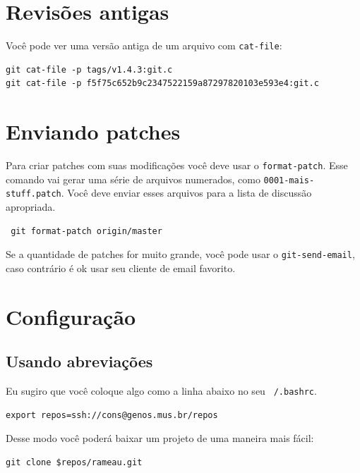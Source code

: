 \documentclass[12pt,brazil]{book}
\begin{document}
\section{Revisões antigas}
\label{sec:revisoes-antigas}

Você pode ver uma versão antiga de um arquivo com \texttt{cat-file}:

\begin{verbatim}
git cat-file -p tags/v1.4.3:git.c
git cat-file -p f5f75c652b9c2347522159a87297820103e593e4:git.c
\end{verbatim}

\section{Enviando patches}
\label{sec:enviando-patches}

Para criar patches com suas modificações você deve usar o
\texttt{format-patch}. Esse comando vai gerar uma série de arquivos
numerados, como \texttt{0001-mais-stuff.patch}. Você deve enviar esses
arquivos para a lista de discussão apropriada.

\begin{verbatim}
 git format-patch origin/master
\end{verbatim}

Se a quantidade de patches for muito grande, você pode usar o
\texttt{git-send-email}, caso contrário é ok usar seu cliente de email
favorito.

\section{Configuração}
\label{sec:configuracao}

\subsection{Usando abreviações}
\label{sec:usando-abreviacoes}

Eu sugiro que você coloque algo como a linha abaixo no seu
\texttt{~/.bashrc}.

\begin{verbatim}
export repos=ssh://cons@genos.mus.br/repos
\end{verbatim}

Desse modo você poderá baixar um projeto de uma maneira mais fácil:

\begin{verbatim}
git clone $repos/rameau.git
\end{verbatim}
\end{document}
